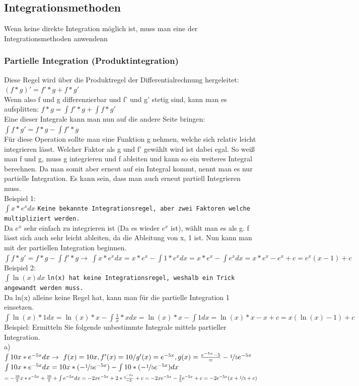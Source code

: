 \documentclass{article}
\begin{document}
	\subsection{Integrationsmethoden}
	Wenn keine direkte Integration möglich ist, muss man eine der Integrationsmethoden anwendenn
	\subsubsection{Partielle Integration (Produktintegration)}
	Diese Regel wird über die Produktregel der Differentialrechnung hergeleitet: $(f*g)'=f'*g+f*g'$ \\
	Wenn also f und g differenzierbar und f' und g' stetig sind, kann man es aufsplitten: $f*g=\int f'*g+\int f*g'$ \\
	Eine dieser Integrale kann man nun auf die andere Seite bringen: $\int f*g'=f*g-\int f'*g$ \\
	Für diese Operation sollte man eine Funktion g nehmen, welche sich relativ leicht integrieren lässt. Welcher Faktor als g und f' gewählt wird ist dabei egal. So weiß man f und g, muss g integrieren und f ableiten und kann so ein weiteres Integral berechnen. Da man somit aber erneut auf ein Integral kommt, nennt man es nur partielle Integration. Es kann sein, dass man auch erneut partiell Integrieren muss. \\
	Beispiel 1: \\
	$\int x*e^xdx$ \verb|Keine bekannte Integrationsregel, aber zwei Faktoren welche multipliziert werden.| \\
	Da $e^x$ sehr einfach zu integrieren ist (Da es wieder $e^x$ ist), wählt man es als g. f lässt sich auch sehr leicht ableiten, da die Ableitung von x, 1 ist. Nun kann man mit der partiellen Integration beginnen. \\
	$\int f*g'=f*g-\int f'*g \to\ \int x*e^xdx=x*e^x-\int 1*e^xdx=x*e^x-\int e^xdx=x*e^x-e^x+c=e^x(x-1)+c$  \\
	Beispiel 2: \\
	$\int \ln(x)dx$ \verb|ln(x) hat keine Integrationsregel, weshalb ein Trick angewandt werden muss.| \\
	Da ln(x) alleine keine Regel hat, kann man für die partielle Integration 1 einsetzen. \\
	$\int \ln(x)*1dx=\ln(x)*x-\int\frac{1}{x}*xdx=\ln(x)*x-\int 1dx=\ln(x)*x-x+c=x(\ln(x)-1)+c$ \\
	Beispiel: Ermitteln Sie folgende unbestimmte Integrale mittels partieller Integration. \\
	a) $\int 10x*e^{-5x}dx\to\ f(x)=10x, f'(x)=10/g'(x)=e^{-5x}, g(x)=\frac{e^{-5x}{-5}}=-\nicefrac{1}{5}e^{-5x}$ \\
	$\int 10x*e^{-5x}dx=10x*(-\nicefrac{1}{5}e^{-5x})-\int 10*(-\nicefrac{1}{5}e^{-5x})dx$ \\
	$=-\frac{10}{5}x*e^{-5x}+\frac{10}{5}+\int e^{-5x}dx=-2xe^{-5x}+2*\frac{e^{-5x}}{-5}+c=-2xe^{-5x}-\frac{2}{5}e^{-5x}+c=-2e^{-5x}(x+\nicefrac{1}{5}+c)$
\end{document}
